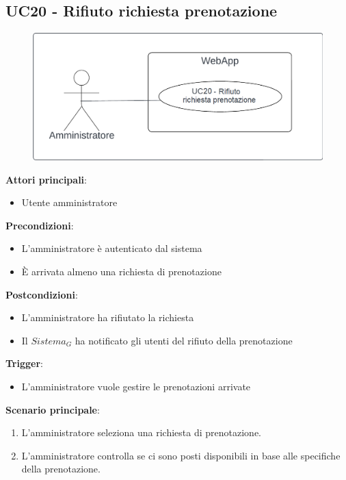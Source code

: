 \subsection{UC20 - Rifiuto richiesta prenotazione}\label{usecase:20}
\begin{figure}[H]
    \centering
    \includegraphics[width=0.9\linewidth]{ucd/ucd20.png}
\end{figure}
\textbf{Attori principali}:
\begin{itemize}
    \item Utente amministratore
\end{itemize}
\textbf{Precondizioni}:
\begin{itemize}
    \item L'amministratore è autenticato dal sistema
    \item \`E arrivata almeno una richiesta di prenotazione
\end{itemize}
\textbf{Postcondizioni}:
\begin{itemize}
    \item L'amministratore ha rifiutato la richiesta
    \item Il $\textit{Sistema}_G$ ha notificato gli utenti del rifiuto della prenotazione
\end{itemize}
\textbf{Trigger}:
\begin{itemize}
    \item L'amministratore vuole gestire le prenotazioni arrivate
\end{itemize}
\textbf{Scenario principale}:
\begin{enumerate}
    \item L'amministratore seleziona una richiesta di prenotazione.
    \item L'amministratore controlla se ci sono posti disponibili in base alle specifiche della prenotazione.
\end{enumerate}
\newpage


